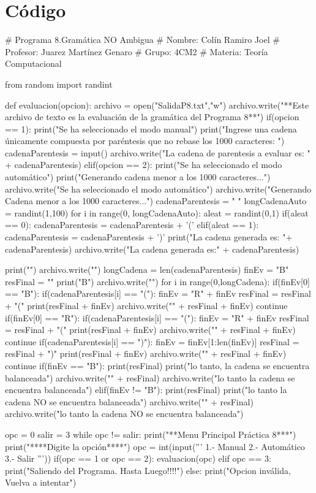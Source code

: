 \documentclass{article}
\begin{document}
	\section*{Código}
	\begin{python}
		# Programa 8.Gramática NO Ambigua
		# Nombre: Colín Ramiro Joel
		# Profesor: Juarez Martínez Genaro
		# Grupo: 4CM2
		# Materia: Teoría Computacional
		
		from random import randint
		
		def evaluacion(opcion):
		archivo = open("SalidaP8.txt","w")
		archivo.write("**Este archivo de texto es la evaluación de la gramática del Programa 8**\n\n")
		if(opcion == 1):
		print("Se ha seleccionado el modo manual\n")
		print("Ingrese una cadena únicamente compuesta por paréntesis que no rebase los 1000 caracteres: ")
		cadenaParentesis = input()
		archivo.write("La cadena de parentesis a evaluar es: " + cadenaParentesis)
		elif(opcion == 2):
		print("Se ha seleccionado el modo automático\n")
		print("Generando cadena menor a los 1000 caracteres...")
		archivo.write("Se ha seleccionado el modo automático\n")        
		archivo.write("Generando Cadena menor a los 1000 caracteres...")  
		cadenaParentesis = " "
		longCadenaAuto = randint(1,100)
		for i in range(0, longCadenaAuto):
		aleat = randint(0,1)
		if(aleat == 0):
		cadenaParentesis = cadenaParentesis + '('
		elif(aleat == 1):                 
		cadenaParentesis = cadenaParentesis + ')'
		print("La cadena generada es: "+ cadenaParentesis)
		archivo.write("La cadena generada es:" + cadenaParentesis)   
		
		print("")
		archivo.write("\n ")
		longCadena = len(cadenaParentesis)
		finEv = "B"
		resFinal = ""
		print("B")
		archivo.write("\nB")
		for i in range(0,longCadena):        
		if(finEv[0] == "B"):
		if(cadenaParentesis[i] == "("):
		finEv = "R" + finEv
		resFinal = resFinal + "("
		print(resFinal + finEv)
		archivo.write("\n" + resFinal + finEv)
		continue                 
		if(finEv[0] == "R"):
		if(cadenaParentesis[i] == "("):
		finEv = "R" + finEv
		resFinal = resFinal + "("
		print(resFinal + finEv)
		archivo.write("\n" + resFinal + finEv)
		continue            
		if(cadenaParentesis[i] == ")"):
		finEv = finEv[1:len(finEv)]
		resFinal = resFinal + ")"
		print(resFinal + finEv)
		archivo.write("\n" + resFinal + finEv)
		continue
		if(finEv == "B"):
		print(resFinal)
		print("\nPor lo tanto, la cadena se encuentra balanceada")
		archivo.write("\n" + resFinal)
		archivo.write("\nPor lo tanto la cadena se encuentra balanceada")
		elif(finEv != "B"):
		print(resFinal)
		print("\nPor lo tanto la cadena NO se encuentra balanceada")
		archivo.write("\n" + resFinal)
		archivo.write("\nPor lo tanto la cadena NO se encuentra balanceada")
		
		opc = 0
		salir = 3
		while opc != salir:
		print("\n***Menu Principal Práctica 8***\n")
		print("****Digite la opción****")
		opc = int(input('''
		1.- Manual
		2.- Automático
		3.- Salir
		'''))  
		if(opc == 1 or opc == 2):
		evaluacion(opc)   
		elif opc == 3:
		print("Saliendo del Programa. Hasta Luego!!!!")
		else:
		print("Opcion inválida, Vuelva a intentar")
	\end{python}
\end{document}
